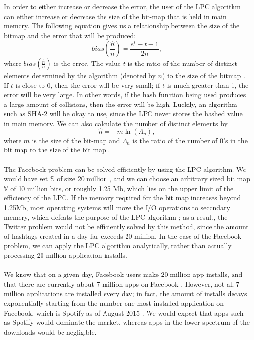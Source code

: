 \documentclass{article}
\begin{document}
\\\\
\indent In order to either increase or decrease the error, the user of the LPC algorithm can either increase or decrease the size of the bit-map that is held in main memory. The following equation gives us a relationship between the size of the bitmap and the error that will be produced:
\[
bias\left(\frac{\hat{n}}{n}\right) = \frac{e^{t} - t - 1}{2n},
\]
where $bias\left(\frac{\hat{n}}{n}\right)$ is the error. The value $t$ is the ratio of the number of distinct elements determined by the algorithm (denoted by $n$) to the size of the bitmap \cite{Whang}. If $t$ is close to 0, then the error will be very small; if $t$ is much greater than 1, the error will be very large. In other words, if the hash function being used produces a large amount of collisions, then the error will be high. Luckily, an algorithm such as SHA-2 will be okay to use, since the LPC never stores the hashed value in main memory. We can also calculate the number of distinct elements by 
\[
\hat{n} = -m \ln{(\Lambda_{n})},
\]
where $m$ is the size of the bit-map and $\Lambda_{n}$ is the ratio of the number of 0's in the bit map to the size of the bit map \cite[p. 212]{Whang}. 
\\\\
\indent The Facebook problem can be solved efficiently by using the LPC algorithm. We would have set $\mathbb{S}$ of size 20 million \cite{Facebook}, and we can choose an arbitrary sized bit map $\mathbb{V}$ of 10 million bits, or roughly 1.25 Mb, which lies on the upper limit of the efficiency of the LPC. If the memory required for the bit map increases beyond 1.25Mb, most operating systems will move the I/O operations to secondary memory, which defeats the purpose of the LPC algorithm \cite[p. 211]{Whang}; as a result, the Twitter problem would not be efficiently solved by this method, since the amount of hashtags created in a day far exceeds 20 million. In the case of the Facebook problem, we can apply the LPC algorithm analytically, rather than actually processing 20 million application installs.
\\\\
\indent We know that on a given day, Facebook users make 20 million app installs, and that there are currently about 7 million apps on Facebook \cite{Facebook}. 
However, not all 7 million applications are installed every day; in fact, the amount of installs decays exponentially starting from the number one most installed application on Facebook, which is Spotify as of August 2015 \cite{Facebook-2}. We would expect that apps such as Spotify would dominate the market, whereas apps in the lower spectrum of the downloads would be negligible. 
\end{document}
